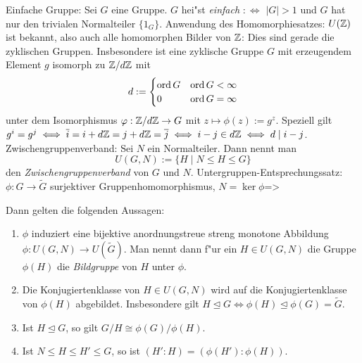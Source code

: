  Einfache Gruppe:{
  Sei $G$ eine Gruppe. $G$ hei"st \emph{einfach} $:\iff $ $|G|>1$ und $G$
  hat nur den trivialen Normalteiler $\{1_G\}$.
  }
\remark Anwendung des Homomorphiesatzes:{
  $U(\mathbb Z)$ ist bekannt, also auch alle homomorphen Bilder von $\mathbb Z$:
  Dies sind gerade die zyklischen Gruppen. Insbesondere ist eine zyklische
  Gruppe $G$ mit erzeugendem Element $g$ isomorph zu $\mathbb Z/d\mathbb Z$ mit
  \[d:=\begin{cases}
      \operatorname{ord} G & \operatorname{ord} G<\infty \\
      0 & \operatorname{ord} G=\infty
      \end{cases}
    \]
  unter dem Isomorphismus $\varphi:\mathbb Z/d\mathbb Z\to G$ mit $z\mapsto \phi(z):=g^z$.
  Speziell gilt $g^i=g^j\iff \overline i=i+d\mathbb Z=j+d\mathbb Z=\overline j\iff
  i-j\in d\mathbb Z\iff d\mid i-j$.
  }
 Zwischengruppenverband:{
  Sei $N$ ein Normalteiler.
  Dann nennt man
  \[U(G,N):=\{H\mid N\leq H\leq G\}
    \]
  den \emph{Zwischengruppenverband} von $G$ und $N$.
  }
\theorem Untergruppen-Entsprechungssatz:
  $\phi:G\to\tilde G$ surjektiver Gruppenhomomorphismus, $N=\ker \phi$=>{
  \label{the:untergruppen-entsprechung}
  Dann gelten die folgenden Aussagen:
  \begin{enumerate}
    \item $\phi$ induziert eine bijektive anordnungstreue streng monotone
      Abbildung $\phi:U(G,N)\to U(\tilde G)$. Man nennt dann f"ur ein
      $H\in U(G,N)$ die Gruppe $\phi(H)$ die \emph{Bildgruppe} von $H$ unter
      $\phi$.
    \item Die Konjugiertenklasse von $H\in U(G,N)$ wird auf die 
      Konjugiertenklasse von $\phi(H)$ abgebildet. Insbesondere
      gilt $H \unlhd G\iff \phi(H) \unlhd \phi(G)=\tilde G$.
    \item Ist $H\unlhd G$, so gilt $G/H\cong \phi(G)/ \phi(H)$.
    \item Ist $N\leq H\leq H'\leq G$, so ist $(H':H)=(\phi(H'):\phi(H))$.
    \end{enumerate}
  }
